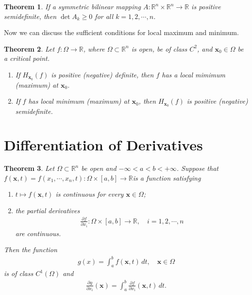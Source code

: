 \documentclass[10pt]{book}
\newtheorem{theorem}{Theorem}[chapter]
\theoremstyle{definition}
\numberwithin{equation}{chapter}
\begin{document}
\medskip

\begin{theorem}
If a symmetric bilinear mapping $A: \mathbb{R}^n \times \mathbb{R}^n \to \mathbb{R}$ is positive semidefinite, then $\det A_k \geq 0$ for all $k = 1,2,\cdots,n$.
\end{theorem}

\medskip

Now we can discuss the sufficient conditions for local maximum and minimum.

\medskip

\begin{theorem}
Let $f: \Omega \to \mathbb{R}$, where $\Omega \subset \mathbb{R}^n$ is open, be of class $C^2$, and $\mathbf{x}_0 \in \Omega$ be a critical point.
\begin{enumerate}[label=(\alph*)]
    \item If $H_{\mathbf{x}_0}(f)$ is positive (negative) definite, then $f$ has a local mimimum (maximum) at $\mathbf{x}_0$.
    
    \item If $f$ has local minimum (maximum) at $\mathbf{x}_0$, then $H_{\mathbf{x}_0}(f)$ is positive (negative) semidefinite.
\end{enumerate}
\end{theorem}

\medskip

\section{Differentiation of Derivatives}

\begin{theorem}\label{th_724}
Let $\Omega \subset \mathbb{R}^n$ be open and $-\infty < a < b < +\infty$. Suppose that $f(\mathbf{x},t) = f(x_1,\cdots,x_n,t): \Omega \times [a,b] \to \mathbb{R}$is a function satisfying
\begin{enumerate}[label=(\alph*)]
    \item $t \mapsto f(\mathbf{x},t)$ is continuous for every $\mathbf{x} \in \Omega$;
    
    \item the partial derivatives
    \begin{align*}
        \frac{\partial f}{\partial x_i}: \Omega \times [a,b] \to \mathbb{R}, \quad i = 1,2,\cdots,n
    \end{align*}
    are continuous.
\end{enumerate}
Then the function
\begin{align*}
    g(x) = \int^b_a f(\mathbf{x},t) \,dt, \quad \mathbf{x} \in \Omega
\end{align*}
is of class $C^1(\Omega)$ and 
\begin{align}\label{th_724_equ1}
    \frac{\partial g}{\partial x_i}(\mathbf{x}) = \int^b_a \frac{\partial f}{\partial x_i}(\mathbf{x},t) \,dt.
\end{align}
\end{theorem}
\end{document}

